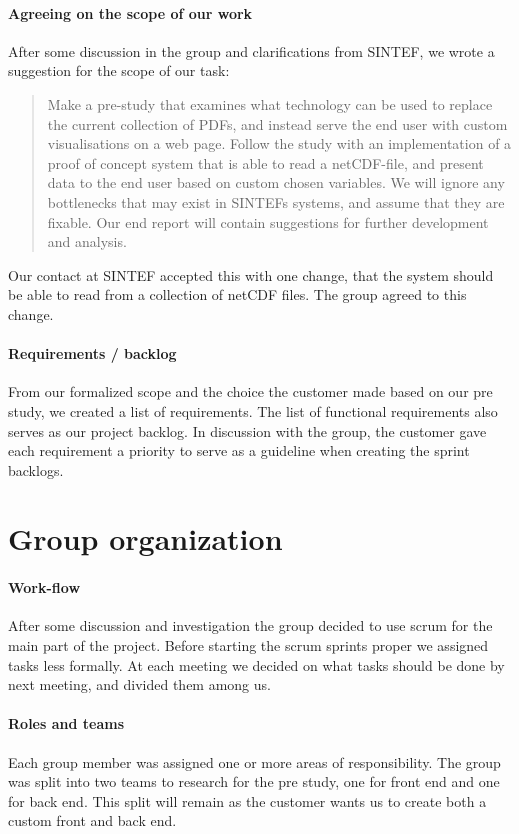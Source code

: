 \documentclass[11pt,a4paper,titlepage,oneside]{report}
\begin{document}
\paragraph{Agreeing on the scope of our work}
After some discussion in the group and clarifications from SINTEF, we wrote a suggestion for the scope of our task: 
\begin{quote} Make a pre-study that examines what technology can be used to replace the current collection of PDFs, and instead serve the end user with custom visualisations on a web page. Follow the study with an implementation of a proof of concept system that is able to read a netCDF-file, and present data to the end user based on custom chosen variables. We will ignore any bottlenecks that may exist in SINTEFs systems, and assume that they are fixable. Our end report will contain suggestions for further development and analysis.
\end{quote}
Our contact at SINTEF accepted this with one change, that the system should be able to read from a collection of netCDF files. The group agreed to this change.

\paragraph{Requirements / backlog}
From our formalized scope and the choice the customer made based on our pre study, we created a list of requirements. The list of functional requirements also serves as our project backlog. In discussion with the group, the customer gave each requirement a priority to serve as a guideline when creating the sprint backlogs.

\section{Group organization}
\paragraph{Work-flow}
After some discussion and investigation the group decided to use scrum for the main part of the project. Before starting the scrum sprints proper we assigned tasks less formally. At each meeting we decided on what tasks should be done by next meeting, and divided them among us.

\paragraph{Roles and teams}
Each group member was assigned one or more areas of responsibility. The group was split into two teams to research for the pre study, one for front end and one for back end. This split will remain as the customer wants us to create both a custom front and back end.
\end{document}

